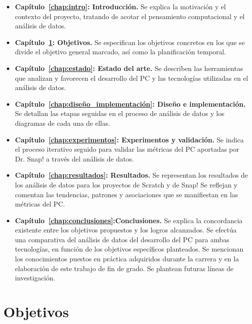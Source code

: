 \documentclass[a4paper, 12pt]{book}
\begin{document}
\begin{itemize}
    \item \textbf{Capítulo~\ref{chap:intro}: Introducción.} Se explica la motivación y el contexto del proyecto, tratando de acotar el pensamiento computacional y el análisis de datos.
    \item \textbf{Capítulo~\ref{chap:objetivos}: Objetivos.} Se especifican los objetivos concretos en los que se divide el objetivo general marcado, así como la planificación temporal.
    \item \textbf{Capítulo~\ref{chap:estado}: Estado del arte.} Se describen las herramientas que analizan y favorecen el desarrollo del PC y las tecnologías utilizadas en el análisis de datos.
    \item \textbf{Capítulo~\ref{chap:diseño_implementación}: Diseño e implementación.} Se detallan las etapas seguidas en el proceso de análisis de datos y los diagramas de cada una de ellas.
    \item \textbf{Capítulo~\ref{chap:experimentos}: Experimentos y validación.} Se indica el proceso iterativo seguido para validar las métricas del PC aportadas por Dr. Snap! a través del análisis de datos.
    \item \textbf{Capítulo~\ref{chap:resultados}: Resultados.} Se representan los resultados de los análisis de datos para los proyectos de Scratch y de Snap! Se reflejan y comentan las tendencias, patrones y asociaciones que se manifiestan en las métricas del PC. 
    \item \textbf{Capítulo~\ref{chap:conclusiones}:Conclusiones.} Se explica la concordancia existente entre los objetivos propuestos y los logros alcanzados. Se efectúa una comparativa del análisis de datos del desarrollo del PC para ambas tecnologías, en función de los objetivos específicos planteados. Se mencionan los conocimientos puestos en práctica adquiridos durante la carrera y en la elaboración de este trabajo de fin de grado. Se plantean futuras líneas de investigación. 
\end{itemize}




\cleardoublepage %
\chapter{Objetivos} 
\label{chap:objetivos} 
\end{document}
